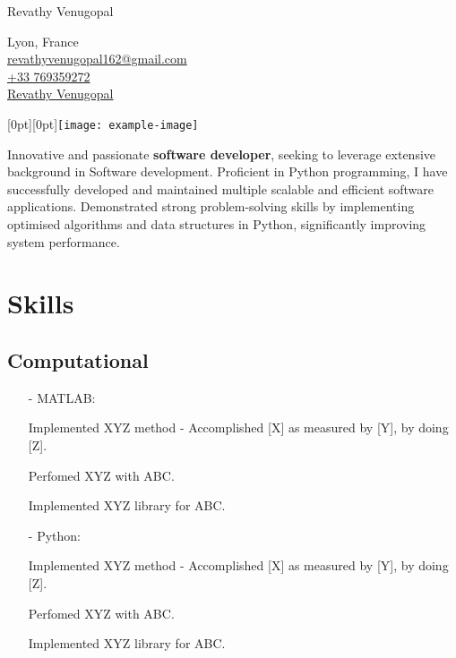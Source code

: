 \documentclass[11pt]{article}
\begin{document}

\begin{flushleft}
    {\fontsize{30}{30}\selectfont Revathy Venugopal} \\ \bigskip
    
    {\color{icnclr}\faMapMarker} {Lyon, France} \\ \bigskip
    {\color{icnclr}\faEnvelope[regular]} \href{mailto:revathyvenugopal162@gmail.com}{revathyvenugopal162@gmail.com} \\ \bigskip
    {\color{icnclr}} \href{tel:+33769359272}{+33 769359272} \\ \bigskip
    {\color{icnclr}\faLinkedinIn} \href{https://www.linkedin.com/in/revathy-venugopal-3310b5147/}{Revathy Venugopal}
\end{flushleft}
\noindent
\hfill
\raisebox{0pt}[0pt][0pt]{\texttt{[image: example-image]}} %

\noindent
Innovative and passionate \textbf{software developer}, seeking to leverage extensive background in Software development.
Proficient in Python programming, I have successfully developed and maintained multiple scalable and efficient software applications.
Demonstrated strong problem-solving skills by implementing optimised algorithms and data structures in Python, significantly improving system performance.
%
\section{Skills}
\subsection{Computational}
\begin{itemize}
    \item[-] \textcolor{Sepia}{MATLAB}:
    \item[\textbullet] Implemented XYZ method - Accomplished [X] as measured by [Y], by doing [Z].  
    \item[\textbullet] Perfomed XYZ with ABC. 
    \item[\textbullet] Implemented XYZ library for ABC. 
    \item[-] \textcolor{Sepia}{Python}: 
    \item[\textbullet] Implemented XYZ method - Accomplished [X] as measured by [Y], by doing [Z].  
    \item[\textbullet] Perfomed XYZ with ABC. 
    \item[\textbullet] Implemented XYZ library for ABC.
\end{itemize}
\end{document}
